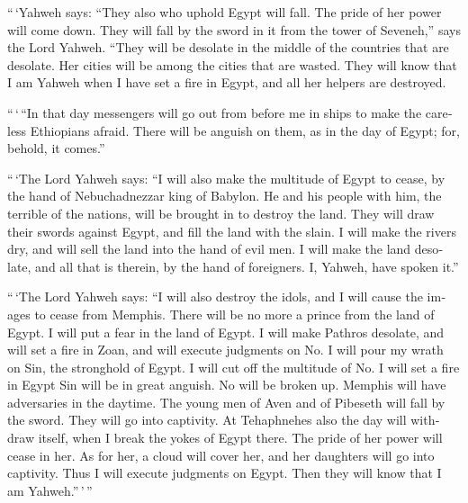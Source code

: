 \begin{paracol}{2}
\begin{otherlanguage}{english}
 ``\,`Yahweh says: ``They also who uphold Egypt will fall.
The pride of her power will come down. They will fall by the sword in it
from the tower of Seveneh,'' says the Lord Yahweh.  ``They
will be desolate in the middle of the countries that are desolate. Her
cities will be among the cities that are wasted.  They
will know that I am Yahweh when I have set a fire in Egypt, and all her
helpers are destroyed.

 ``\,`\,``In that day messengers will go out from before
me in ships to make the careless Ethiopians afraid. There will be
anguish on them, as in the day of Egypt; for, behold, it comes.''

 ``\,`The Lord Yahweh says: ``I will also make the
multitude of Egypt to cease, by the hand of Nebuchadnezzar king of
Babylon.  He and his people with him, the terrible of the
nations, will be brought in to destroy the land. They will draw their
swords against Egypt, and fill the land with the slain. 
I will make the rivers dry, and will sell the land into the hand of evil
men. I will make the land desolate, and all that is therein, by the hand
of foreigners. I, Yahweh, have spoken it.''

 ``\,`The Lord Yahweh says: ``I will also destroy the
idols, and I will cause the images to cease from Memphis. There will be
no more a prince from the land of Egypt. I will put a fear in the land
of Egypt.  I will make Pathros desolate, and will set a
fire in Zoan, and will execute judgments on No.  I will
pour my wrath on Sin, the stronghold of Egypt. I will cut off the
multitude of No.  I will set a fire in Egypt Sin will be
in great anguish. No will be broken up. Memphis will have adversaries in
the daytime.  The young men of Aven and of Pibeseth will
fall by the sword. They will go into captivity.  At
Tehaphnehes also the day will withdraw itself, when I break the yokes of
Egypt there. The pride of her power will cease in her. As for her, a
cloud will cover her, and her daughters will go into captivity.
 Thus I will execute judgments on Egypt. Then they will
know that I am Yahweh.''\,'\,''


\end{otherlanguage}
\end{paracol}
